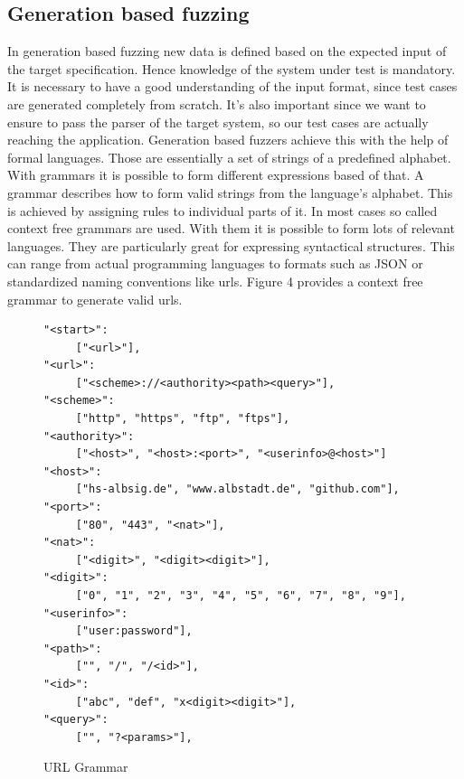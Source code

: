 \documentclass[journal=tosc,final]{iacrtrans}
\begin{document}
\subsection{Generation based fuzzing}
In generation based fuzzing new data is defined based on the expected input of the target specification. Hence knowledge of the system under test is mandatory. It is necessary to have a good understanding of the input format, since test cases are generated completely from scratch. It's also important since we want to ensure to pass the parser of the target system, so our test cases are actually reaching the application.
Generation based fuzzers achieve this with the help of formal languages. Those are essentially a set of strings of a predefined alphabet. With grammars it is possible to form different expressions based of that. A grammar describes how to form valid strings from the language's alphabet. This is achieved by assigning rules to individual parts of it.
In most cases so called context free grammars are used. With them it is possible to form lots of relevant languages. They are particularly great for expressing syntactical structures. This can range from actual programming languages to formats such as JSON or standardized naming conventions like urls. Figure 4 provides a context free grammar to generate valid urls.
\begin{figure}[h]
 \caption{URL Grammar}
 \begin{center}
\begin{shaded}
\begin{internallinenumbers}
\begin{verbatim}
"<start>":
     ["<url>"],
"<url>":
     ["<scheme>://<authority><path><query>"],
"<scheme>":
     ["http", "https", "ftp", "ftps"],
"<authority>":
     ["<host>", "<host>:<port>", "<userinfo>@<host>"]
"<host>":  
     ["hs-albsig.de", "www.albstadt.de", "github.com"],
"<port>":
     ["80", "443", "<nat>"],
"<nat>":
     ["<digit>", "<digit><digit>"],
"<digit>":
     ["0", "1", "2", "3", "4", "5", "6", "7", "8", "9"],
"<userinfo>":  
     ["user:password"],
"<path>":  
     ["", "/", "/<id>"],
"<id>":  
     ["abc", "def", "x<digit><digit>"],
"<query>":
     ["", "?<params>"],
\end{verbatim}
\end{internallinenumbers}
\end{shaded}
\end{center}

\end{figure}
\end{document}
